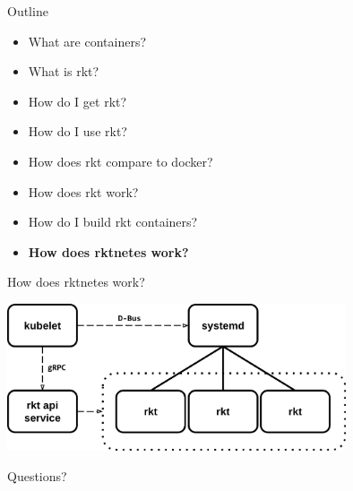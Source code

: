 \documentclass[pdf,aspectratio=169,14pt]{beamer}
\begin{document}
\begin{frame}
    Outline
    \begin{itemize}
        \item What are containers?
        \item What is rkt?
        \item How do I get rkt?
        \item How do I use rkt?
        \item How does rkt compare to docker?
        \item How does rkt work?
        \item How do I build rkt containers?
        \item \textbf{How does rktnetes work?}
    \end{itemize}
\end{frame}

\begin{frame}{How does rktnetes work?}
    \begin{center}
        \includegraphics[width=0.75\textwidth]{rktnetes-model}
    \end{center}
\end{frame}

\begin{frame}
    \center \LARGE Questions? \normalsize
\end{frame}
\end{document}
